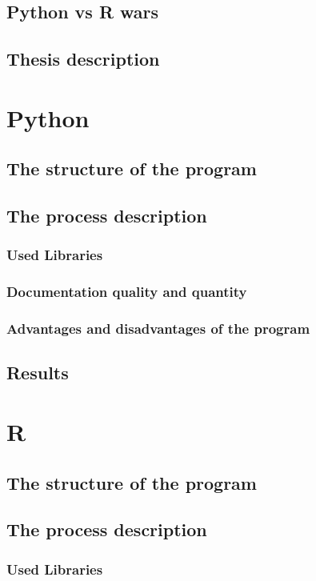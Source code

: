 \documentclass{article}
\begin{document}
\subsection{Python vs R wars}

\subsection{Thesis description}


\newpage
\section{Python}
\subsection{The structure of the program}
\subsection{The process description}
\subsubsection{Used Libraries}
\subsubsection{Documentation quality and quantity}
\subsubsection{Advantages and disadvantages of the program}
\subsection{Results}

\newpage
\section{R}
\subsection{The structure of the program}
\subsection{The process description}
\subsubsection{Used Libraries}
\end{document}

